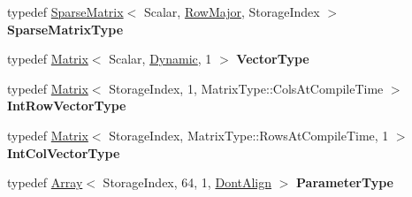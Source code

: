 \begin{DoxyCompactItemize}
typedef \hyperlink{group___sparse_core___module_class_eigen_1_1_sparse_matrix}{Sparse\+Matrix}$<$ Scalar, \hyperlink{group__enums_ggaacded1a18ae58b0f554751f6cdf9eb13acfcde9cd8677c5f7caf6bd603666aae3}{Row\+Major}, Storage\+Index $>$ {\bfseries Sparse\+Matrix\+Type}
\item 
\mbox{\label{class_eigen_1_1_pardiso_impl_a80b4f80cc8041abae10fe370172143fa}} 
typedef \hyperlink{group___core___module_class_eigen_1_1_matrix}{Matrix}$<$ Scalar, \hyperlink{namespace_eigen_ad81fa7195215a0ce30017dfac309f0b2}{Dynamic}, 1 $>$ {\bfseries Vector\+Type}
\item 
\mbox{\label{class_eigen_1_1_pardiso_impl_a90be930fec075f5fd78b9082f720d56b}} 
typedef \hyperlink{group___core___module_class_eigen_1_1_matrix}{Matrix}$<$ Storage\+Index, 1, Matrix\+Type\+::\+Cols\+At\+Compile\+Time $>$ {\bfseries Int\+Row\+Vector\+Type}
\item 
\mbox{\label{class_eigen_1_1_pardiso_impl_a11e6b204912c77d1eceeb05f712b946b}} 
typedef \hyperlink{group___core___module_class_eigen_1_1_matrix}{Matrix}$<$ Storage\+Index, Matrix\+Type\+::\+Rows\+At\+Compile\+Time, 1 $>$ {\bfseries Int\+Col\+Vector\+Type}
\item 
\mbox{\label{class_eigen_1_1_pardiso_impl_a5b0f199e9396b2aaac3bf80d34ac10ec}} 
typedef \hyperlink{group___core___module_class_eigen_1_1_array}{Array}$<$ Storage\+Index, 64, 1, \hyperlink{group__enums_ggaacded1a18ae58b0f554751f6cdf9eb13a40a452614141522dd313363dbbd65726}{Dont\+Align} $>$ {\bfseries Parameter\+Type}
\end{DoxyCompactItemize}

